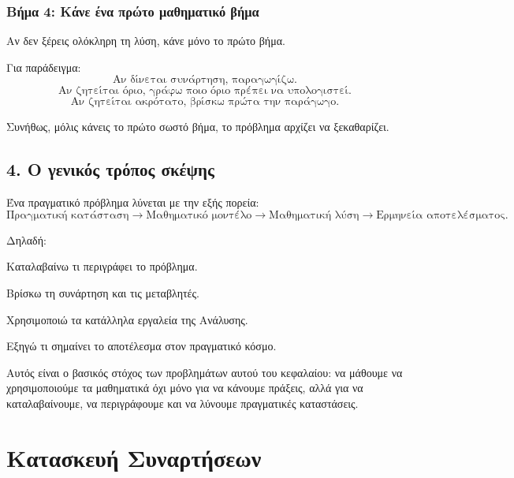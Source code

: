 \subsubsection*{Βήμα 4: Κάνε ένα πρώτο μαθηματικό βήμα}

Αν δεν ξέρεις ολόκληρη τη λύση, κάνε μόνο το πρώτο βήμα.

Για παράδειγμα:
\[
\text{Αν δίνεται συνάρτηση, παραγωγίζω.}
\]
\[
\text{Αν ζητείται όριο, γράφω ποιο όριο πρέπει να υπολογιστεί.}
\]
\[
\text{Αν ζητείται ακρότατο, βρίσκω πρώτα την παράγωγο.}
\]

Συνήθως, μόλις κάνεις το πρώτο σωστό βήμα, το πρόβλημα αρχίζει να ξεκαθαρίζει.

\subsection*{4. Ο γενικός τρόπος σκέψης}

\begin{parat}{\textwidth}
Ένα πραγματικό πρόβλημα λύνεται με την εξής πορεία:
\[
\text{Πραγματική κατάσταση}
\longrightarrow
\text{Μαθηματικό μοντέλο}
\longrightarrow
\text{Μαθηματική λύση}
\longrightarrow
\text{Ερμηνεία αποτελέσματος}.
\]
\end{parat}

Δηλαδή:

\begin{alist}
\item Καταλαβαίνω τι περιγράφει το πρόβλημα.
\item Βρίσκω τη συνάρτηση και τις μεταβλητές.
\item Χρησιμοποιώ τα κατάλληλα εργαλεία της Ανάλυσης.
\item Εξηγώ τι σημαίνει το αποτέλεσμα στον πραγματικό κόσμο.
\end{alist}

Αυτός είναι ο βασικός στόχος των προβλημάτων αυτού του κεφαλαίου: να μάθουμε να χρησιμοποιούμε τα μαθηματικά όχι μόνο για να κάνουμε πράξεις, αλλά για να καταλαβαίνουμε, να περιγράφουμε και να λύνουμε πραγματικές καταστάσεις.


\section{Κατασκευή Συναρτήσεων}

